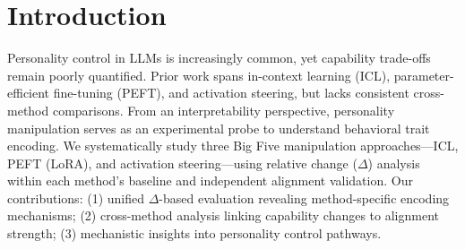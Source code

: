 \section{Introduction}

Personality control in LLMs is increasingly common, yet capability trade-offs remain poorly quantified. Prior work spans in-context learning (ICL), parameter-efficient fine-tuning (PEFT), and activation steering, but lacks consistent cross-method comparisons. From an interpretability perspective, personality manipulation serves as an experimental probe to understand behavioral trait encoding. We systematically study three Big Five manipulation approaches—ICL, PEFT (LoRA), and activation steering—using relative change (\(\Delta\)) analysis within each method's baseline and independent alignment validation. Our contributions: (1) unified \(\Delta\)-based evaluation revealing method-specific encoding mechanisms; (2) cross-method analysis linking capability changes to alignment strength; (3) mechanistic insights into personality control pathways.
